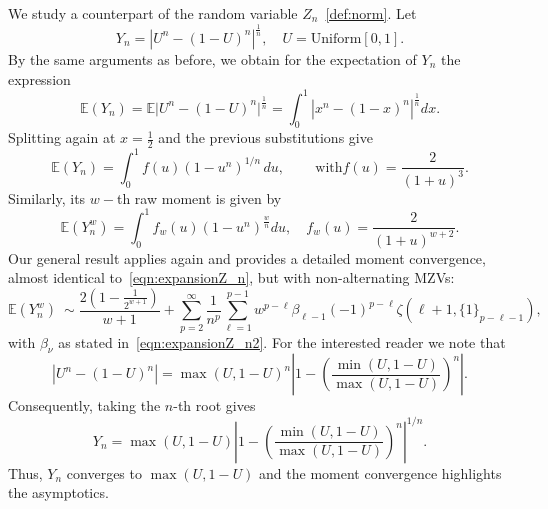 \documentclass[10pt,reqno,a4paper]{amsart}%
\theoremstyle{definition}
\newcommand{\E}{\ensuremath{\mathbb{E}}} %
\begin{document}
We study a counterpart of the random variable $Z_{n}$~\eqref{def:norm}. Let
\begin{equation}
Y_{n}=|U^{n}-(1-U)^{n}|^{\frac{1}{n}},\quad U=\text{Uniform}[0,1].
\label{def:rvDiff}%
\end{equation}
By the same arguments as before, we obtain for the expectation of $Y_{n}$ the
expression
\[
\E(Y_{n})=\E\Big|U^{n}-(1-U)^{n}\Big|^{\frac{1}{n}}=\int
_{0}^{1}|x^{n}-(1-x)^{n}|^{\frac{1}{n}}dx.
\]
Splitting again at $x=\frac{1}{2}$ and the previous substitutions give
\[
\E(Y_{n})=\int_{0}^{1}f(u)(1-u^{n})^{1/n}\,du,\,\qquad\text{with
}f(u)=\frac{2}{(1+u)^{3}}.
\]
Similarly, its $w-$th raw moment is given by
\[
\E(Y_{n}^{w})=\int_{0}^{1}f_{w}(u)(1-u^{n})^{\frac{w}{n}}du,\quad
f_{w}(u)=\frac{2}{(1+u)^{w+2}}.
\]
Our general result applies again and provides a detailed moment convergence,
almost identical to~\eqref{eqn:expansionZ_n}, but with non-alternating MZVs:
\begin{equation}
\E(Y_{n}^{w})~\sim\frac{2\left(  1-\frac{1}{2^{w+1}}\right)  }%
{w+1}+\sum_{p=2}^{\infty}\frac{1}{n^{p}}\sum_{\ell=1}^{p-1}w^{p-\ell}%
\beta_{\ell-1}(-1)^{p-\ell}\zeta(\ell+1,\{1\}_{p-\ell-1}),
\label{eqn:expansionY_n}%
\end{equation}
with $\beta_{\nu}$ as stated in~\eqref{eqn:expansionZ_n2}. For the interested
reader we note that
\[
|U^{n}-(1-U)^{n}|=\max(U,1-U)^{n}\left\vert 1-\left(  \frac{\min(U,1-U)}%
{\max(U,1-U)}\right)  ^{n}\right\vert .
\]
Consequently, taking the $n$-th root gives
\[
Y_{n}=\max(U,1-U)\left\vert 1-\left(  \frac{\min(U,1-U)}{\max(U,1-U)}\right)
^{n}\right\vert ^{1/n}.
\]
Thus, $Y_{n}$ converges
to $\max(U,1-U)$ and the moment convergence highlights the asymptotics.



{}
\end{document}
